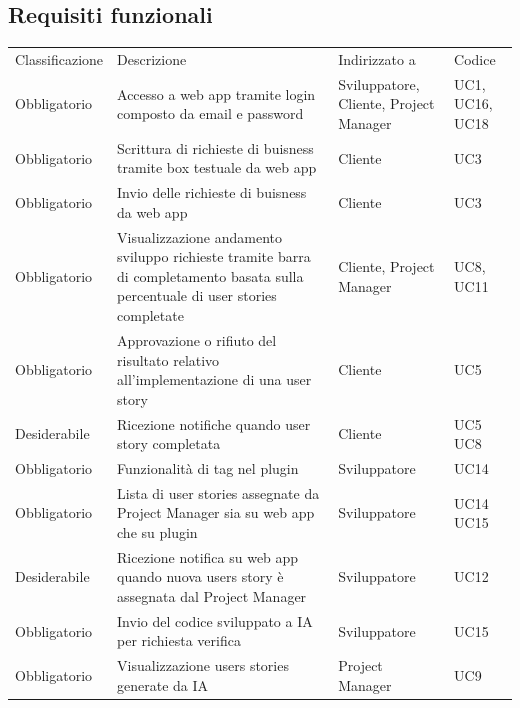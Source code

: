 \documentclass{article}
\begin{document}
\subsection{Requisiti funzionali}
\begin{center}
    \begin{tabular}{|p{3cm}|p{6cm}|p{}|p{3cm}|}
    \rowcolor{Blue} 
\hline
Classificazione & Descrizione & Indirizzato a&Codice  \\ 
\rowcolor{LightBlue}
\hline
Obbligatorio & Accesso a web app tramite login composto da email e password & Sviluppatore, Cliente, Project Manager & UC1, UC16, UC18 \\ 
\rowcolor{LighterBlue}
\hline
Obbligatorio & Scrittura di richieste di buisness tramite box testuale da web app & Cliente & UC3\\ 
\rowcolor{LightBlue}
\hline
Obbligatorio & Invio delle richieste di buisness da web app & Cliente & UC3\\
\hline
\rowcolor{LighterBlue}

Obbligatorio & Visualizzazione andamento sviluppo richieste tramite barra di completamento basata sulla percentuale di user stories completate & Cliente, Project Manager & UC8, UC11\\
\rowcolor{LightBlue}
\hline
Obbligatorio & Approvazione o rifiuto del risultato relativo all'implementazione di una user story & Cliente & UC5\\
\hline
\rowcolor{LighterBlue}

Desiderabile & Ricezione notifiche quando user story completata & Cliente & UC5 UC8\\
\hline
\rowcolor{LightBlue}
\hline
Obbligatorio & Funzionalità di tag nel plugin  & Sviluppatore & UC14\\
\hline
\rowcolor{LighterBlue}

Obbligatorio & Lista di user stories assegnate da Project Manager sia su web app che su plugin & Sviluppatore & UC14 UC15\\
\hline
\rowcolor{LightBlue}

Desiderabile & Ricezione notifica su web app quando nuova users story è assegnata dal Project Manager& Sviluppatore & UC12\\
\hline
\rowcolor{LighterBlue}
Obbligatorio & Invio del codice sviluppato a IA per richiesta verifica& Sviluppatore & UC15\\

\hline
\rowcolor{LightBlue}

Obbligatorio & Visualizzazione users stories generate da IA  & Project Manager & UC9\\
\hline




\end{tabular}
\end{center}
\end{document}
